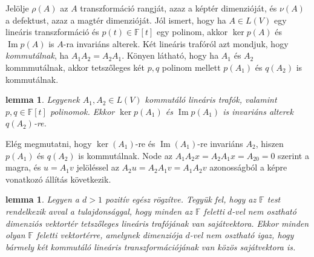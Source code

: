 \documentclass[9pt, showtrims]{memoir}
\makeatletter
\renewenvironment{proof}[1][\proofname]
    {\par\pushQED{\qed}%
    \normalfont \topsep6\p@\@plus6\p@\relax
    \trivlist
    \item[\hskip\labelsep
        \itshape
    #1\@addpunct{:}]\ignorespaces}
    {\popQED\endtrivlist\@endpefalse}
\theoremstyle{plain}
\newtheorem{lemma}[proposition]{lemma}
\theoremstyle{remark}
\theoremstyle{definition}
\makeatother
\begin{document}
Jelölje $\rho\left( A \right)$ az $A$ transzformáció rangját, 
azaz a képtér dimenzióját,
és $\nu\left( A \right)$ a defektust, azaz a magtér dimenzióját.
Jól ismert, hogy ha $A\in L\left( V \right)$ egy lineáris transzformáció
és $p\left( t \right)\in\mathbb{F}\left[ t \right]$ egy polinom, akkor 
$\operatorname{ker}p\left( A \right)$ és
$\operatorname{Im}p\left( A \right)$ is $A$-ra invariáns alterek.
Két lineáris trafóról azt mondjuk, hogy \emph{kommutálnak},
ha $A_1A_2=A_2A_1.$
Könyen látható, hogy ha $A_1$ és $A_2$ kommmutálnak, akkor tetszőleges két $p,q$
polinom mellett $p\left( A_1 \right)$ és $q\left( A_2 \right)$ is kommutálnak.
\begin{lemma}
    Legyenek $A_1,A_2\in L\left( V \right)$ kommutáló lineáris trafók,
    valamint $p,q\in\mathbb{F}\left[ t \right]$ polinomok.
    Ekkor $\operatorname{ker}p\left( A_1 \right)$ és
    $\operatorname{Im}p\left( A_1 \right)$ is invariáns alterek $q\left( A_2 \right)$-re.
\end{lemma}
\begin{proof}
    Elég megmutatni, hogy $\operatorname{ker}\left( A_1 \right)$-re és
    $\operatorname{Im}\left( A_1 \right)$-re invariáns $A_2$, hiszen $p\left( A_1 \right)$ 
    és $q\left( A_2 \right)$ is kommutálnak.
    Node az
    \(
        A_1 A_2 x=A_2A_1x=A_20=0
    \)
    szerint a magra,
    és $u=A_1v$ jelöléssel az
    \(
        A_2u=A_2 A_1v =A_1A_2v 
    \)
    azonosságból a képre vonatkozó állítás következik.
\end{proof}
\begin{lemma}
    \label{le:indukcio}
    Legyen a $d>1$ pozitív egész rögzítve. 
    Tegyük fel, hogy az $\mathbb{F}$ test rendelkezik avval a tulajdonsággal,
    hogy minden az $\mathbb{F}$ feletti $d$-vel nem osztható dimenziós vektortér tetszőleges
    lineáris trafójának van sajátvektora.
    Ekkor minden olyan $\mathbb{F}$ feletti vektortérre, 
    amelynek dimenziója $d$-vel nem osztható igaz, 
    hogy bármely két kommutáló lineáris transzformációjának van közös sajátvektora is.
\end{lemma}
\end{document}
